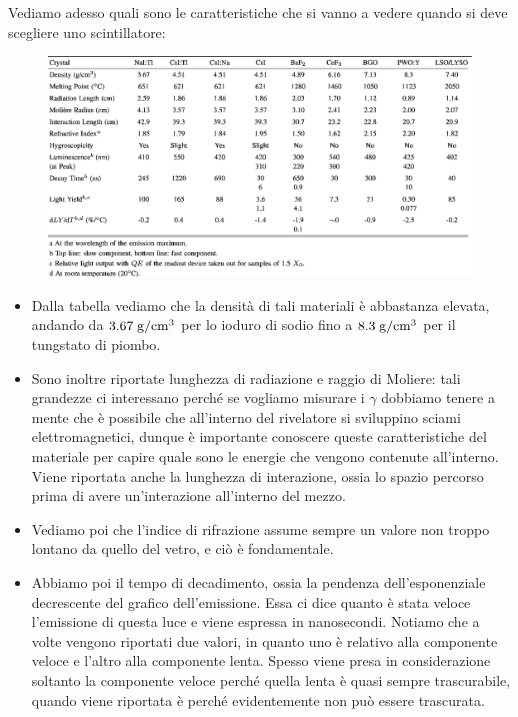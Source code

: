\begin{esempio}
   Vediamo adesso quali sono le caratteristiche che si vanno a vedere quando si deve scegliere uno scintillatore:
   \begin{figure}[H]
      \centering
      \includegraphics[width=\textwidth]{immagini/caratteristiche_scintillatori_inorganici.png}
   \end{figure}
   \begin{itemize}[leftmargin=0.5cm]
      \item Dalla tabella vediamo che la densità di tali materiali è abbastanza elevata, andando da $\rm 3.67 \; g/cm^3$ per lo ioduro di sodio fino a $\rm 8.3 \; g/cm^3$ per il tungstato di piombo.
      \item Sono inoltre riportate lunghezza di radiazione e raggio di Moliere: tali grandezze ci interessano perché se vogliamo misurare i $\gamma$ dobbiamo tenere a mente che è possibile che all'interno del rivelatore si sviluppino sciami elettromagnetici, dunque è importante conoscere queste caratteristiche del materiale per capire quale sono le energie che vengono contenute all'interno. Viene riportata anche la lunghezza di interazione, ossia lo spazio percorso prima di avere un'interazione all'interno del mezzo.
      \item Vediamo poi che l'indice di rifrazione assume sempre un valore non troppo lontano da quello del vetro, e ciò è fondamentale.
      \item Abbiamo poi il tempo di decadimento, ossia la pendenza dell'esponenziale decrescente del grafico dell'emissione. Essa ci dice quanto è stata veloce l'emissione di questa luce e viene espressa in nanosecondi. Notiamo che a volte vengono riportati due valori, in quanto uno è relativo alla componente veloce e l'altro alla componente lenta. Spesso viene presa in considerazione soltanto la componente veloce perché quella lenta è quasi sempre trascurabile, quando viene riportata è perché evidentemente non può essere trascurata. 

\end{itemize}
\end{esempio}

